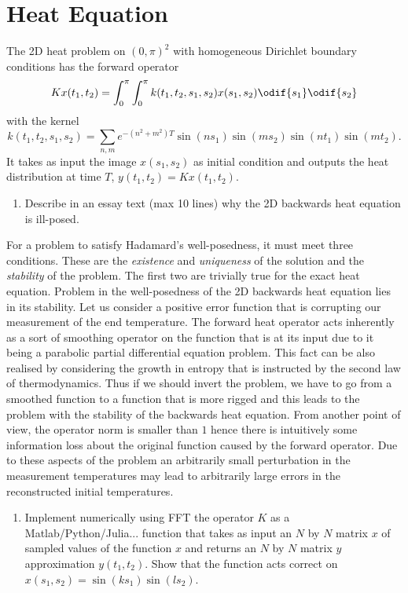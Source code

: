 \section{Heat Equation}%
\label{sec:heat-equation}

The 2D heat problem on $(0,\pi)^2$ with homogeneous Dirichlet boundary conditions has the forward operator
    \[
        Kx(t_1,t_2) = \int_0^\pi \int_0^\pi k(t_1,t_2,s_1,s_2)x(s_1,s_2)\odif{s_1}\odif{s_2}
    \]
with the kernel
    \[
        k(t_1,t_2,s_1,s_2) = \sum_{n,m} e^{-(n^2+m^2)T}\sin(ns_1)\sin(ms_2)\sin(nt_1)\sin(mt_2).
    \]
It takes as input the image $x(s_1,s_2)$ as initial condition and outputs the heat distribution at time $T$, $y(t_1,t_2)
    = Kx(t_1,t_2)$.

\begin{enumerate}[label = (\alph*)]
    \item Describe in an essay text (max 10 lines) why the 2D backwards heat equation is ill-posed.
\end{enumerate}

\nopagebreak
\noindent\hrulefill

For a problem to satisfy Hadamard's well-posedness, it must meet three conditions.
These are the \emph{existence} and \emph{uniqueness} of the solution and the \emph{stability} of the problem.
The first two are trivially true for the exact heat equation.
Problem in the well-posedness of the 2D backwards heat equation lies in its stability.
Let us consider a positive error function that is corrupting our measurement of the end temperature.
The forward heat operator acts inherently as a sort of smoothing operator on the function that is at its input due to it
    being a parabolic partial differential equation problem.
This fact can be also realised by considering the growth in entropy that is instructed by the second law of
    thermodynamics.
Thus if we should invert the problem, we have to go from a smoothed function to a function that is more rigged and this
    leads to the problem with the stability of the backwards heat equation.
From another point of view, the operator norm is smaller than \(1\) hence there is intuitively some information loss
    about the original function caused by the forward operator.
Due to these aspects of the problem an arbitrarily small perturbation in the measurement temperatures may lead to
    arbitrarily large errors in the reconstructed initial temperatures.

\nopagebreak
\noindent\hrulefill

\begin{enumerate}[resume, label = (\alph*)]
    \item Implement numerically using FFT the operator $K$ as a Matlab/Python/Julia... function that takes as input
        an $N$ by $N$ matrix $x$ of sampled values of the function $x$ and returns an $N$ by $N$ matrix $y$
        approximation $y(t_1,t_2)$. Show that the function acts correct on $x(s_1,s_2) = \sin(ks_1)\sin(ls_2)$.
\end{enumerate}

